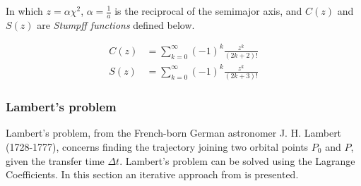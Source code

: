 In which $z = \alpha \chi^2$, $\alpha = \frac{1}{a}$ is the reciprocal of the semimajor axis, and $C(z)$ and $S(z)$ are \textit{Stumpff functions} defined below.

\begin{align}
    C(z) &= \sum_{k = 0}^{\infty} (-1)^k \frac{z^k}{(2k + 2)!} \\
    S(z) &= \sum_{k = 0}^{\infty} (-1)^k \frac{z^k}{(2k + 3)!}
\end{align}{}

\subsubsection{Lambert's problem}

Lambert's problem, from the French-born German astronomer J. H. Lambert (1728-1777), concerns finding the trajectory joining two orbital points $P_0$ and $P$, given the transfer time $\Delta t$. Lambert's problem can be solved using the Lagrange Coefficients. In this section an iterative approach from \cite{Curtis2009} is presented.






